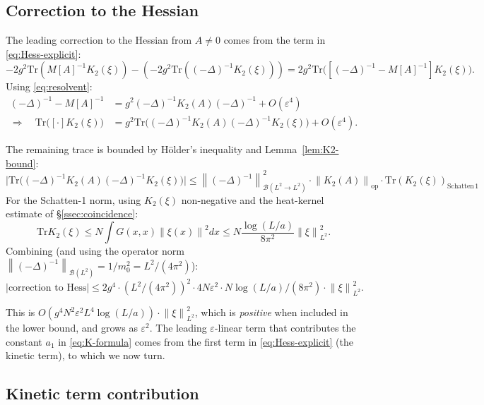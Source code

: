 \documentclass[11pt,a4paper]{amsart}
\theoremstyle{definition}
\newcommand{\norm}[1]{\left\lVert#1\right\rVert}
\newcommand{\Tr}{\mathrm{Tr}}
\newcommand{\Hess}{\mathrm{Hess}}
\begin{document}
\subsection{Correction to the Hessian}

The leading correction to the Hessian from $A \neq 0$ comes from the term in
\eqref{eq:Hess-explicit}:
\[
-2 g^2 \Tr(M[A]^{-1} K_2(\xi)) - (-2g^2 \Tr((-\Delta)^{-1} K_2(\xi)))
= 2 g^2 \Tr\bigl([(-\Delta)^{-1} - M[A]^{-1}] K_2(\xi)\bigr).
\]
Using \eqref{eq:resolvent}:
\begin{align}
(-\Delta)^{-1} - M[A]^{-1} &= g^2 (-\Delta)^{-1} K_2(A) (-\Delta)^{-1} + O(\varepsilon^4)\\
\Rightarrow \quad \Tr\bigl([\cdot] K_2(\xi)\bigr) &= g^2 \Tr\bigl((-\Delta)^{-1} K_2(A) (-\Delta)^{-1} K_2(\xi)\bigr) + O(\varepsilon^4).
\end{align}

The remaining trace is bounded by H\"older's inequality and Lemma~\ref{lem:K2-bound}:
\[
\bigl|\Tr\bigl((-\Delta)^{-1} K_2(A) (-\Delta)^{-1} K_2(\xi)\bigr)\bigr|
\leq \norm{(-\Delta)^{-1}}_{\mathcal B(L^2 \to L^2)}^2 \cdot \norm{K_2(A)}_{\mathrm{op}} \cdot \Tr(K_2(\xi))_{\mathrm{Schatten\,1}}
\]
For the Schatten-1 norm, using $K_2(\xi)$ non-negative and the heat-kernel
estimate of \S\ref{ssec:coincidence}:
\[
\Tr K_2(\xi) \leq N \int G(x, x) \norm{\xi(x)}^2 dx \leq N \frac{\log(L/a)}{8\pi^2} \norm{\xi}^2_{L^2}.
\]
Combining (and using the operator norm $\norm{(-\Delta)^{-1}}_{\mathcal B(L^2)}
= 1/m_0^2 = L^2/(4\pi^2)$):
\begin{equation}\label{eq:correction}
\bigl|\text{correction to } \Hess\bigr| \leq 2 g^4 \cdot (L^2/(4\pi^2))^2 \cdot 4 N \varepsilon^2 \cdot N \log(L/a) / (8\pi^2) \cdot \norm{\xi}^2_{L^2}.
\end{equation}

This is $O(g^4 N^2 \varepsilon^2 L^4 \log(L/a)) \cdot \norm{\xi}^2_{L^2}$, which is
\emph{positive} when included in the lower bound, and grows as $\varepsilon^2$.
The leading $\varepsilon$-linear term that contributes the constant $a_1$ in
\eqref{eq:K-formula} comes from the first term in \eqref{eq:Hess-explicit}
(the kinetic term), to which we now turn.

\subsection{Kinetic term contribution}
\end{document}
